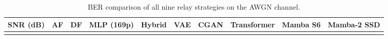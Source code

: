 \documentclass[
  english,
  12pt,
  12pt,
  a4paper,
  oneside]{report}
\begin{document}
\begin{longtable}[]{@{}
  >{\raggedright\arraybackslash}p{}
  >{\raggedright\arraybackslash}p{}
  >{\raggedright\arraybackslash}p{}
  >{\raggedright\arraybackslash}p{}
  >{\raggedright\arraybackslash}p{}
  >{\raggedright\arraybackslash}p{}
  >{\raggedright\arraybackslash}p{}
  >{\raggedright\arraybackslash}p{}
  >{\raggedright\arraybackslash}p{}
  >{\raggedright\arraybackslash}p{}@{}}
\caption{BER comparison of all nine relay strategies on the AWGN channel.}\label{tbl:table1}\tabularnewline
\toprule\noalign{}
\begin{minipage}[b]{\linewidth}\raggedright
SNR (dB)
\end{minipage} & \begin{minipage}[b]{\linewidth}\raggedright
AF
\end{minipage} & \begin{minipage}[b]{\linewidth}\raggedright
DF
\end{minipage} & \begin{minipage}[b]{\linewidth}\raggedright
MLP (169p)
\end{minipage} & \begin{minipage}[b]{\linewidth}\raggedright
Hybrid
\end{minipage} & \begin{minipage}[b]{\linewidth}\raggedright
VAE
\end{minipage} & \begin{minipage}[b]{\linewidth}\raggedright
CGAN
\end{minipage} & \begin{minipage}[b]{\linewidth}\raggedright
Transformer
\end{minipage} & \begin{minipage}[b]{\linewidth}\raggedright
Mamba S6
\end{minipage} & \begin{minipage}[b]{\linewidth}\raggedright
Mamba-2 SSD
\end{minipage} \\
\midrule\noalign{}
\endfirsthead
\toprule\noalign{}
\begin{minipage}[b]{\linewidth}\raggedright

\end{minipage}
\end{longtable}
\end{document}
